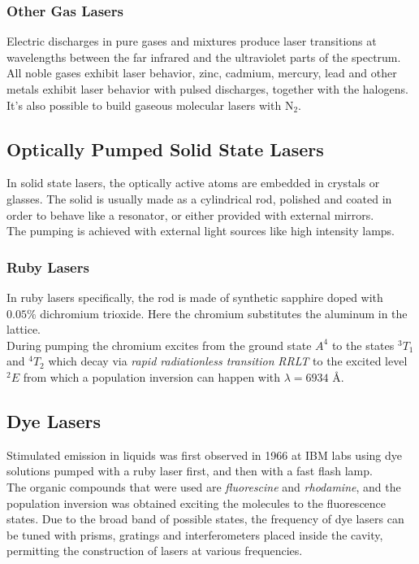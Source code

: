 \documentclass[../electromagnetism.tex]{subfiles}
\begin{document}
\subsubsection{Other Gas Lasers}
Electric discharges in pure gases and mixtures produce laser transitions at wavelengths between the far infrared and the ultraviolet parts of the spectrum.\\
All noble gases exhibit laser behavior, zinc, cadmium, mercury, lead and other metals exhibit laser behavior with pulsed discharges, together with the halogens.\\
It's also possible to build gaseous molecular lasers with $\mathrm{N}_2$.
\subsection{Optically Pumped Solid State Lasers}
In solid state lasers, the optically active atoms are embedded in crystals or glasses. The solid is usually made as a cylindrical rod, polished and coated in order to behave like a resonator, or either provided with external mirrors.\\
The pumping is achieved with external light sources like high intensity lamps.
\subsubsection{Ruby Lasers}
In ruby lasers specifically, the rod is made of synthetic sapphire doped with $0.05\%$ dichromium trioxide. Here the chromium substitutes the aluminum in the lattice.\\
During pumping the chromium excites from the ground state $A^4$ to the states ${}^3T_1$ and ${}^4T_2$ which decay via \textit{rapid radiationless transition} \textit{RRLT} to the excited level ${}^2E$ from which a population inversion can happen with $\lambda=6934$ \AA.
\subsection{Dye Lasers}
Stimulated emission in liquids was first observed in 1966 at IBM labs using dye solutions pumped with a ruby laser first, and then with a fast flash lamp.\\
The organic compounds that were used are \textit{fluorescine} and \textit{rhodamine}, and the population inversion was obtained exciting the molecules to the fluorescence states. Due to the broad band of possible states, the frequency of dye lasers can be tuned with prisms, gratings and interferometers placed inside the cavity, permitting the construction of lasers at various frequencies.
\end{document}
